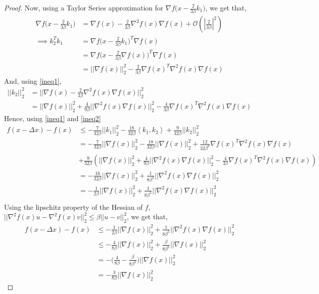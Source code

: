 \begin{proof}
Now, using a Taylor Series approximation for $\nabla f \big( x - \frac{2}{3\beta}k_1 \big)$, we get that,
\begin{equation}
\begin{aligned}\label{ineq1}
\nabla f \big( x - \frac{2}{3\beta}k_1 \big) &= \nabla f(x) - \frac{2}{3\beta} \nabla^2 f(x) \nabla f(x) + \mathcal{O}( |\frac{2}{3\beta} |^2 ) \\
\implies  k_2^Tk_1 &= \nabla f \big( x - \frac{2}{3\beta}k_1 \big)^T\nabla f(x) \\
 &= \nabla f \big( x - \frac{2}{3\beta}\nabla f(x) \big)^T \nabla f(x) \\
&= || \nabla f(x) ||_2^2 - \frac{2}{3 \beta} \nabla f(x)^T \nabla^2 f(x) \nabla f(x)
\end{aligned}
\end{equation}
And, using \eqref{ineq1},
\begin{equation}
\begin{aligned} \label{ineq2}
|| k_2 ||_2^2 &= ||  \nabla f(x) - \frac{2}{3\beta} \nabla^2 f(x) \nabla f(x)  ||_2^2   \\
&= || \nabla f(x)||_2^2 + \frac{4}{9\beta}||\nabla^2 f(x) \nabla f(x)  ||_2^2 - \frac{4}{3\beta} \nabla f(x)^T \nabla^2 f(x) \nabla f(x)
\end{aligned}
\end{equation}
Hence, using \eqref{ineq1} and \eqref{ineq2}
\begin{align*}
f(x - \Delta x) - f(x) & \leq  -\frac{7}{32 \beta}|| k_1 ||_2^2 - \frac{18}{32 \beta} \left\langle k_1, k_2 \right\rangle + \frac{9}{32 \beta}|| k_2 ||_2^2 \\
&= -\frac{7}{32 \beta}|| \nabla f(x) ||_2^2 -  \frac{18}{32 \beta} || \nabla f(x) ||_2^2 + \frac{12}{32 \beta^2} \nabla f(x)^T \nabla^2 f(x) \nabla f(x) \\
&+  \frac{9}{32\beta}( || \nabla f(x)||_2^2 + \frac{4}{9\beta}||\nabla^2 f(x) \nabla f(x)  ||_2^2 - \frac{4}{3\beta} \nabla f(x)^T \nabla^2 f(x) \nabla f(x) )  \\
&= -\frac{16}{32 \beta}|| \nabla f(x)||_2^2 + \frac{1}{8 \beta^2}||\nabla^2 f(x) \nabla f(x)  ||_2^2 \\
&= -\frac{1}{2\beta} || \nabla f(x)||_2^2 + \frac{1}{8 \beta^2}||\nabla^2 f(x) \nabla f(x)  ||_2^2 \\
\end{align*}
Using the lipschitz property of the Hessian of $f$, $||\nabla^2 f(x) u - \nabla^2 f(x) v||_2^2 \leq \beta || u-v ||_2^2 $, we get that,
\begin{equation}
\begin{aligned}
f(x - \Delta x) - f(x) & \leq -\frac{1}{2\beta} || \nabla f(x)||_2^2 + \frac{1}{8 \beta^2}||\nabla^2 f(x) \nabla f(x)  ||_2^2 \\
& \leq -\frac{4}{8\beta}|| \nabla f(x) ||_2^2 + \frac{\beta}{8 \beta^2}|| \nabla f(x) ||_2^2 \\
& = -\big( \frac{4}{8\beta} - \frac{\beta}{8\beta^2}   \big)  || \nabla f(x) ||_2^2  \\
&= -\frac{3}{8\beta} || \nabla f(x) ||_2^2
\end{aligned}
\end{equation}
\end{proof}
